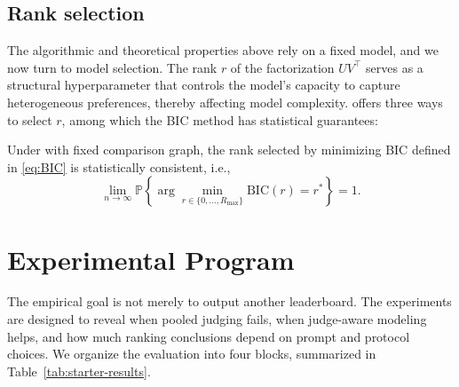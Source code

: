 \documentclass{article}
\begin{document}
\begin{bibunit}[unsrtnat]
\subsection{Rank selection} \label{subsec:rank-selection}
The algorithmic and theoretical properties above rely on a fixed model, and we now turn to model selection.
The rank $r$ of the factorization $UV^\top$ serves as a structural hyperparameter that controls the model's capacity to capture heterogeneous preferences, thereby affecting model complexity.
 offers three ways to select $r$, among which the BIC method has statistical guarantees:
\begin{theorem}
\label{thm:bic_consistency}
Under  with fixed comparison graph, the rank selected by minimizing BIC defined in \eqref{eq:BIC} is statistically consistent, i.e.,
\begin{equation*}
    \lim_{n \to \infty} \mathbb{P} \left\{ \arg\min_{r \in \{0, \dots, R_{\max}\}} \mathrm{BIC}(r) = r^* \right\} = 1.
\end{equation*}
\end{theorem}



\section{Experimental Program}

The empirical goal is not merely to output another leaderboard. The experiments are designed to reveal when pooled judging fails, when judge-aware modeling helps, and how much ranking conclusions depend on prompt and protocol choices. We organize the evaluation into four blocks, summarized in Table~\ref{tab:starter-results}.


\end{bibunit}
\end{document}
